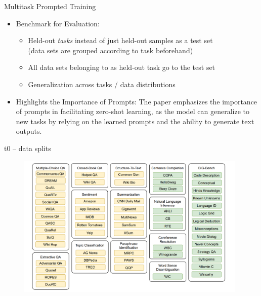 \begin{frame}{Multitask Prompted Training}

\vfill

\begin{itemize}
    \item Benchmark for Evaluation:
        \begin{itemize}
            \item Held-out \textit{tasks} instead of just held-out samples as a test set\\
            (data sets are grouped according to task beforehand)
            \item All data sets belonging to as held-out task go to the test set
            \item Generalization across tasks / data distributions
        \end{itemize}
    \item Highlights the Importance of Prompts: The paper emphasizes the importance of prompts in facilitating zero-shot learning, as the model can generalize to new tasks by relying on the learned prompts and the ability to generate text outputs.
\end{itemize}

\vfill

\end{frame}


\begin{frame}{t0 -- data splits}

\vfill
	
	\begin{figure}
		\centering
		\includegraphics[width = 11cm]{figure/81-t0-data.png}\\ 
	\end{figure}

\vfill

\end{frame}

